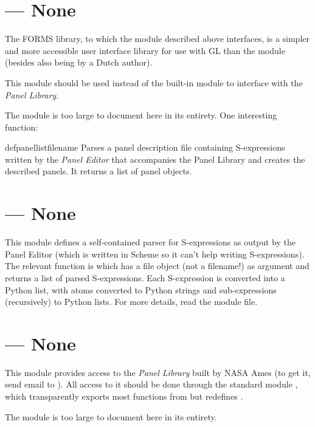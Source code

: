 \section{ ---
         None}



 The FORMS library, to which the
 module described above interfaces, is a
simpler and more accessible user interface library for use with GL
than the  module (besides also being by a Dutch author).

This module should be used instead of the built-in module
to interface with the
\emph{Panel Library}.

The module is too large to document here in its entirety.
One interesting function:

\begin{funcdesc}{defpanellist}{filename}
Parses a panel description file containing S-expressions written by the
\emph{Panel Editor}
that accompanies the Panel Library and creates the described panels.
It returns a list of panel objects.
\end{funcdesc}


\section{ ---
         None}



This module defines a self-contained parser for S-expressions as output
by the Panel Editor (which is written in Scheme so it can't help writing
S-expressions).
The relevant function is
which has a file object (not a filename!) as argument and returns a list
of parsed S-expressions.
Each S-expression is converted into a Python list, with atoms converted
to Python strings and sub-expressions (recursively) to Python lists.
For more details, read the module file.

\section{ ---
         None}



This module provides access to the
\emph{Panel Library}
built by NASA Ames (to get it, send email to
).
All access to it should be done through the standard module
,
which transparently exports most functions from
but redefines
.


The module is too large to document here in its entirety.
